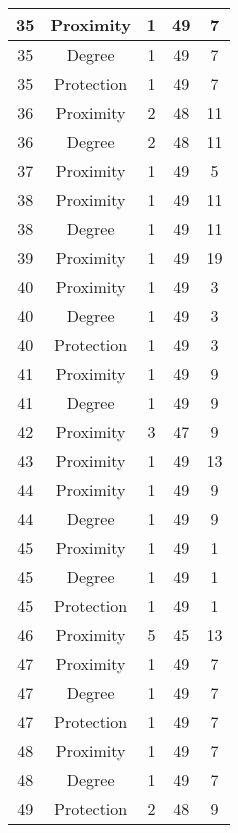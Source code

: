 \documentclass[results.tex]{subfiles}
\begin{document}
\begin{center}
\begin{tabular}{| c || c | c | c | c |}
    35 & Proximity & 1 & 49 & 7 \\ 
    \hline
    35 & Degree & 1 & 49 & 7 \\ 
    \hline
    35 & Protection & 1 & 49 & 7 \\ 
    \hline
    36 & Proximity & 2 & 48 & 11 \\ 
    \hline
    36 & Degree & 2 & 48 & 11 \\ 
    \hline
    37 & Proximity & 1 & 49 & 5 \\ 
    \hline
    38 & Proximity & 1 & 49 & 11 \\ 
    \hline
    38 & Degree & 1 & 49 & 11 \\ 
    \hline
    39 & Proximity & 1 & 49 & 19 \\ 
    \hline
    40 & Proximity & 1 & 49 & 3 \\ 
    \hline
    40 & Degree & 1 & 49 & 3 \\ 
    \hline
    40 & Protection & 1 & 49 & 3 \\ 
    \hline
    41 & Proximity & 1 & 49 & 9 \\ 
    \hline
    41 & Degree & 1 & 49 & 9 \\ 
    \hline
    42 & Proximity & 3 & 47 & 9 \\ 
    \hline
    43 & Proximity & 1 & 49 & 13 \\ 
    \hline
    44 & Proximity & 1 & 49 & 9 \\ 
    \hline
    44 & Degree & 1 & 49 & 9 \\ 
    \hline
    45 & Proximity & 1 & 49 & 1 \\ 
    \hline
    45 & Degree & 1 & 49 & 1 \\ 
    \hline
    45 & Protection & 1 & 49 & 1 \\ 
    \hline
    46 & Proximity & 5 & 45 & 13 \\ 
    \hline
    47 & Proximity & 1 & 49 & 7 \\ 
    \hline
    47 & Degree & 1 & 49 & 7 \\ 
    \hline
    47 & Protection & 1 & 49 & 7 \\ 
    \hline
    48 & Proximity & 1 & 49 & 7 \\ 
    \hline
    48 & Degree & 1 & 49 & 7 \\ 
    \hline
    49 & Protection & 2 & 48 & 9 \\ 
    \hline   \end{tabular}
\end{center}
\end{document}
